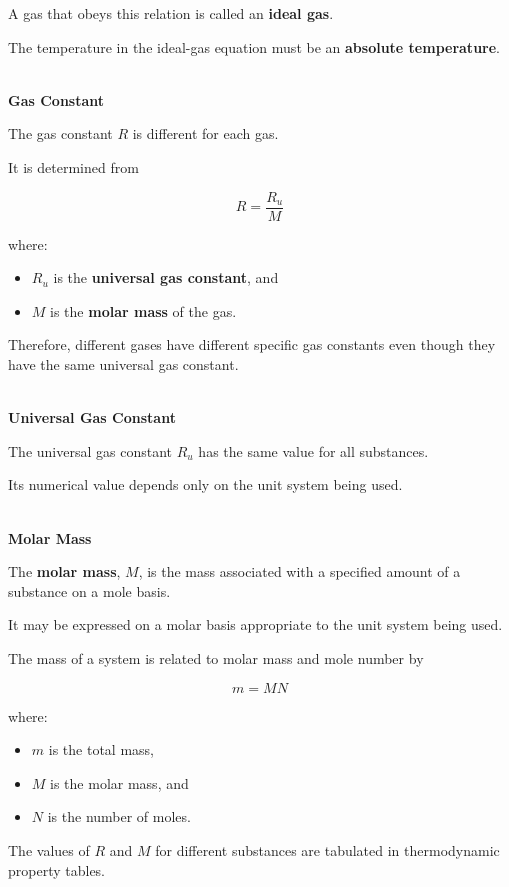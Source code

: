 \documentclass[12pt]{article}
\begin{document}
A gas that obeys this relation is called an \textbf{ideal gas}.

The temperature in the ideal-gas equation must be an \textbf{absolute temperature}.

\textbf{\\ Gas Constant}

The gas constant $R$ is different for each gas.

It is determined from

\begin{equation*}
\boxed{R=\frac{R_u}{M}}
\end{equation*}

where:
\begin{itemize}
    \item $R_u$ is the \textbf{universal gas constant}, and
    \item $M$ is the \textbf{molar mass} of the gas.
\end{itemize}

Therefore, different gases have different specific gas constants even though they have the same universal gas constant.

\textbf{\\ Universal Gas Constant}

The universal gas constant $R_u$ has the same value for all substances.

Its numerical value depends only on the unit system being used.

\textbf{\\ Molar Mass}

The \textbf{molar mass}, $M$, is the mass associated with a specified amount of a substance on a mole basis.

It may be expressed on a molar basis appropriate to the unit system being used.

The mass of a system is related to molar mass and mole number by

\begin{equation*}
\boxed{m=MN}
\end{equation*}

where:
\begin{itemize}
    \item $m$ is the total mass,
    \item $M$ is the molar mass, and
    \item $N$ is the number of moles.
\end{itemize}

The values of $R$ and $M$ for different substances are tabulated in thermodynamic property tables.
\end{document}
